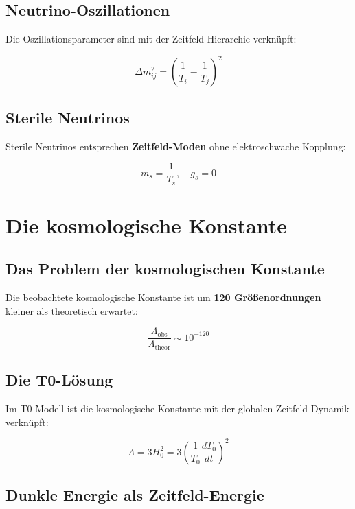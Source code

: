 \documentclass[12pt,a4paper]{report}
\begin{document}
	\subsection{Neutrino-Oszillationen}
	
	Die Oszillationsparameter sind mit der Zeitfeld-Hierarchie verknüpft:
	
	\begin{equation}
		\Delta m_{ij}^2 = \left(\frac{1}{T_i} - \frac{1}{T_j}\right)^2
	\end{equation}
	
	\subsection{Sterile Neutrinos}
	
	Sterile Neutrinos entsprechen \textbf{Zeitfeld-Moden} ohne elektroschwache Kopplung:
	
	\begin{equation}
		m_s = \frac{1}{T_s}, \quad g_s = 0
	\end{equation}
	
	\section{Die kosmologische Konstante}
	
	\subsection{Das Problem der kosmologischen Konstante}
	
	Die beobachtete kosmologische Konstante ist um \textbf{120 Größenordnungen} kleiner als theoretisch erwartet:
	
	\begin{equation}
		\frac{\Lambda_{\text{obs}}}{\Lambda_{\text{theor}}} \sim 10^{-120}
	\end{equation}
	
	\subsection{Die T0-Lösung}
	
	Im T0-Modell ist die kosmologische Konstante mit der globalen Zeitfeld-Dynamik verknüpft:
	
	\begin{equation}
		\Lambda = 3H_0^2 = 3\left(\frac{1}{T_0}\frac{dT_0}{dt}\right)^2
	\end{equation}
	
	\subsection{Dunkle Energie als Zeitfeld-Energie}
	
\end{document}
